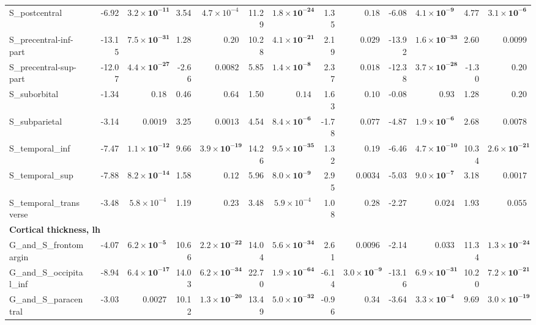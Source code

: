 {\begin{longtable}{llrrrrrrrrrrrr}
S\_postcentral &  & -6.92 & $\mathbf{3.2{\times}10^{-11}}$ & 3.54 & $4.7{\times}10^{-4}$ & 11.29 & $\mathbf{1.8{\times}10^{-24}}$ & 1.35 & $0.18$ & -6.08 & $\mathbf{4.1{\times}10^{-9}}$ & 4.77 & $\mathbf{3.1{\times}10^{-6}}$ \\
S\_precentral-inf-part &  & -13.15 & $\mathbf{7.5{\times}10^{-31}}$ & 1.28 & $0.20$ & 10.28 & $\mathbf{4.1{\times}10^{-21}}$ & 2.19 & $0.029$ & -13.92 & $\mathbf{1.6{\times}10^{-33}}$ & 2.60 & $0.0099$ \\
S\_precentral-sup-part &  & -12.07 & $\mathbf{4.4{\times}10^{-27}}$ & -2.66 & $0.0082$ & 5.85 & $\mathbf{1.4{\times}10^{-8}}$ & 2.37 & $0.018$ & -12.38 & $\mathbf{3.7{\times}10^{-28}}$ & -1.30 & $0.20$ \\
S\_suborbital &  & -1.34 & $0.18$ & 0.46 & $0.64$ & 1.50 & $0.14$ & 1.63 & $0.10$ & -0.08 & $0.93$ & 1.28 & $0.20$ \\
S\_subparietal &  & -3.14 & $0.0019$ & 3.25 & $0.0013$ & 4.54 & $\mathbf{8.4{\times}10^{-6}}$ & -1.78 & $0.077$ & -4.87 & $\mathbf{1.9{\times}10^{-6}}$ & 2.68 & $0.0078$ \\
S\_temporal\_inf &  & -7.47 & $\mathbf{1.1{\times}10^{-12}}$ & 9.66 & $\mathbf{3.9{\times}10^{-19}}$ & 14.26 & $\mathbf{9.5{\times}10^{-35}}$ & 1.32 & $0.19$ & -6.46 & $\mathbf{4.7{\times}10^{-10}}$ & 10.34 & $\mathbf{2.6{\times}10^{-21}}$ \\
S\_temporal\_sup &  & -7.88 & $\mathbf{8.2{\times}10^{-14}}$ & 1.58 & $0.12$ & 5.96 & $\mathbf{8.0{\times}10^{-9}}$ & 2.95 & $0.0034$ & -5.03 & $\mathbf{9.0{\times}10^{-7}}$ & 3.18 & $0.0017$ \\
S\_temporal\_transverse &  & -3.48 & $5.8{\times}10^{-4}$ & 1.19 & $0.23$ & 3.48 & $5.9{\times}10^{-4}$ & 1.08 & $0.28$ & -2.27 & $0.024$ & 1.93 & $0.055$ \\
\midrule\multicolumn{14}{l}{\textbf{Cortical thickness, lh}} \\
G\_and\_S\_frontomargin &  & -4.07 & $\mathbf{6.2{\times}10^{-5}}$ & 10.66 & $\mathbf{2.2{\times}10^{-22}}$ & 14.04 & $\mathbf{5.6{\times}10^{-34}}$ & 2.61 & $0.0096$ & -2.14 & $0.033$ & 11.34 & $\mathbf{1.3{\times}10^{-24}}$ \\
G\_and\_S\_occipital\_inf &  & -8.94 & $\mathbf{6.4{\times}10^{-17}}$ & 14.03 & $\mathbf{6.2{\times}10^{-34}}$ & 22.70 & $\mathbf{1.9{\times}10^{-64}}$ & -6.14 & $\mathbf{3.0{\times}10^{-9}}$ & -13.16 & $\mathbf{6.9{\times}10^{-31}}$ & 10.20 & $\mathbf{7.2{\times}10^{-21}}$ \\
G\_and\_S\_paracentral &  & -3.03 & $0.0027$ & 10.12 & $\mathbf{1.3{\times}10^{-20}}$ & 13.49 & $\mathbf{5.0{\times}10^{-32}}$ & -0.96 & $0.34$ & -3.64 & $\mathbf{3.3{\times}10^{-4}}$ & 9.69 & $\mathbf{3.0{\times}10^{-19}}$ \\

\end{longtable}}
